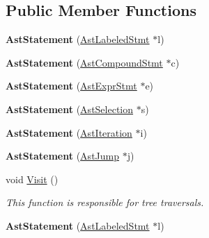 \subsection*{Public Member Functions}
\begin{DoxyCompactItemize}
\item 
\hypertarget{classAstStatement_a51c4738b3eb4d0ce7f7937580827df49}{{\bfseries Ast\-Statement} (\hyperlink{classAstLabeledStmt}{Ast\-Labeled\-Stmt} $\ast$l)}\label{classAstStatement_a51c4738b3eb4d0ce7f7937580827df49}

\item 
\hypertarget{classAstStatement_a06ab5906e58059421ffca709140ad1b0}{{\bfseries Ast\-Statement} (\hyperlink{classAstCompoundStmt}{Ast\-Compound\-Stmt} $\ast$c)}\label{classAstStatement_a06ab5906e58059421ffca709140ad1b0}

\item 
\hypertarget{classAstStatement_a8a44969c79b381d9cef932fc93d99339}{{\bfseries Ast\-Statement} (\hyperlink{classAstExprStmt}{Ast\-Expr\-Stmt} $\ast$e)}\label{classAstStatement_a8a44969c79b381d9cef932fc93d99339}

\item 
\hypertarget{classAstStatement_a8bc036f0b37cacbfa99159e4c57207ec}{{\bfseries Ast\-Statement} (\hyperlink{classAstSelection}{Ast\-Selection} $\ast$s)}\label{classAstStatement_a8bc036f0b37cacbfa99159e4c57207ec}

\item 
\hypertarget{classAstStatement_ae26acf207adc2d426e558e5889b43b54}{{\bfseries Ast\-Statement} (\hyperlink{classAstIteration}{Ast\-Iteration} $\ast$i)}\label{classAstStatement_ae26acf207adc2d426e558e5889b43b54}

\item 
\hypertarget{classAstStatement_a80c754bbc909f7e2e7938e90485d7065}{{\bfseries Ast\-Statement} (\hyperlink{classAstJump}{Ast\-Jump} $\ast$j)}\label{classAstStatement_a80c754bbc909f7e2e7938e90485d7065}

\item 
void \hyperlink{classAstStatement_a1f1570931e373fe2f1e18ce417236ee4}{Visit} ()
\begin{DoxyCompactList}\small\item\em This function is responsible for tree traversals. \end{DoxyCompactList}\item 
\hypertarget{classAstStatement_a51c4738b3eb4d0ce7f7937580827df49}{{\bfseries Ast\-Statement} (\hyperlink{classAstLabeledStmt}{Ast\-Labeled\-Stmt} $\ast$l)}\label{classAstStatement_a51c4738b3eb4d0ce7f7937580827df49}


\end{DoxyCompactItemize}
